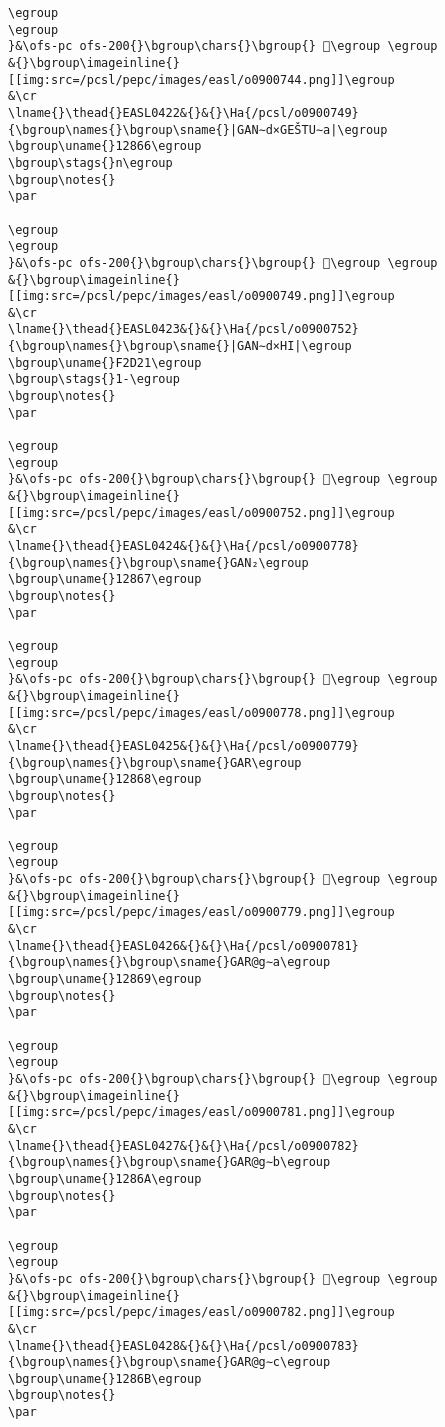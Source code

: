 \begin{verbatim}
\egroup
\egroup
}&\ofs-pc ofs-200{}\bgroup\chars{}\bgroup{} 󲟵\egroup \egroup
&{}\bgroup\imageinline{}[[img:src=/pcsl/pepc/images/easl/o0900744.png]]\egroup
&\cr
\lname{}\thead{}EASL0422&{}&{}\Ha{/pcsl/o0900749}{\bgroup\names{}\bgroup\sname{}|GAN∼d×GEŠTU∼a|\egroup
\bgroup\uname{}12866\egroup
\bgroup\stags{}n\egroup
\bgroup\notes{}
\par 

\egroup
\egroup
}&\ofs-pc ofs-200{}\bgroup\chars{}\bgroup{} 𒡦\egroup \egroup
&{}\bgroup\imageinline{}[[img:src=/pcsl/pepc/images/easl/o0900749.png]]\egroup
&\cr
\lname{}\thead{}EASL0423&{}&{}\Ha{/pcsl/o0900752}{\bgroup\names{}\bgroup\sname{}|GAN∼d×HI|\egroup
\bgroup\uname{}F2D21\egroup
\bgroup\stags{}1-\egroup
\bgroup\notes{}
\par 

\egroup
\egroup
}&\ofs-pc ofs-200{}\bgroup\chars{}\bgroup{} 󲴡\egroup \egroup
&{}\bgroup\imageinline{}[[img:src=/pcsl/pepc/images/easl/o0900752.png]]\egroup
&\cr
\lname{}\thead{}EASL0424&{}&{}\Ha{/pcsl/o0900778}{\bgroup\names{}\bgroup\sname{}GAN₂\egroup
\bgroup\uname{}12867\egroup
\bgroup\notes{}
\par 

\egroup
\egroup
}&\ofs-pc ofs-200{}\bgroup\chars{}\bgroup{} 𒡧\egroup \egroup
&{}\bgroup\imageinline{}[[img:src=/pcsl/pepc/images/easl/o0900778.png]]\egroup
&\cr
\lname{}\thead{}EASL0425&{}&{}\Ha{/pcsl/o0900779}{\bgroup\names{}\bgroup\sname{}GAR\egroup
\bgroup\uname{}12868\egroup
\bgroup\notes{}
\par 

\egroup
\egroup
}&\ofs-pc ofs-200{}\bgroup\chars{}\bgroup{} 𒡨\egroup \egroup
&{}\bgroup\imageinline{}[[img:src=/pcsl/pepc/images/easl/o0900779.png]]\egroup
&\cr
\lname{}\thead{}EASL0426&{}&{}\Ha{/pcsl/o0900781}{\bgroup\names{}\bgroup\sname{}GAR@g∼a\egroup
\bgroup\uname{}12869\egroup
\bgroup\notes{}
\par 

\egroup
\egroup
}&\ofs-pc ofs-200{}\bgroup\chars{}\bgroup{} 𒡩\egroup \egroup
&{}\bgroup\imageinline{}[[img:src=/pcsl/pepc/images/easl/o0900781.png]]\egroup
&\cr
\lname{}\thead{}EASL0427&{}&{}\Ha{/pcsl/o0900782}{\bgroup\names{}\bgroup\sname{}GAR@g∼b\egroup
\bgroup\uname{}1286A\egroup
\bgroup\notes{}
\par 

\egroup
\egroup
}&\ofs-pc ofs-200{}\bgroup\chars{}\bgroup{} 𒡪\egroup \egroup
&{}\bgroup\imageinline{}[[img:src=/pcsl/pepc/images/easl/o0900782.png]]\egroup
&\cr
\lname{}\thead{}EASL0428&{}&{}\Ha{/pcsl/o0900783}{\bgroup\names{}\bgroup\sname{}GAR@g∼c\egroup
\bgroup\uname{}1286B\egroup
\bgroup\notes{}
\par 


\end{verbatim}
